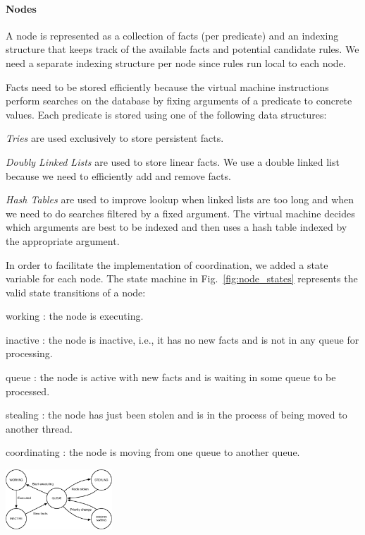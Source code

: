 \paragraph{Nodes} 
A node is represented as a collection of facts (per predicate) and an indexing structure that
keeps track of the available facts and potential candidate rules. We need
a separate indexing structure per node since rules run local to each node.

Facts need to be stored efficiently because the virtual machine instructions
perform searches on the database by fixing arguments of a predicate to concrete
values. Each predicate is stored using one of the following data structures:

\begin{tightitemize}
\item \emph{Tries} are used exclusively to store persistent facts.
\item \emph{Doubly Linked Lists} are used to store 
  linear facts. We use a double linked list because we need to efficiently add
  and remove facts.
\item \emph{Hash Tables} are used to improve lookup when 
  linked lists are too long and when we need to do searches filtered by
  a fixed argument. The virtual machine decides which arguments are
  best to be indexed and then uses a hash table
  indexed by the appropriate argument.
\end{tightitemize}

In order to facilitate the implementation of coordination, we added a state
variable for each node. The state machine in
Fig.~\ref{fig:node_states} represents the valid state transitions of a node:

\begin{tightdescription}
   \item[working]: the node is executing.
   \item[inactive]: the node is inactive, i.e., it has no new facts and is not in any
   queue for processing.
   \item[queue]: the node is active with new facts and is waiting in some queue
   to be processed.
   \item[stealing]: the node has just been stolen and is in the process of being
   moved to another thread.
   \item[coordinating]: the node is moving from one queue to another queue.
\end{tightdescription}

\begin{topfig}
   \centering
   \includegraphics[width=0.3\textwidth]{node_states.pdf}
\vspace*{.5ex}
\end{topfig}

